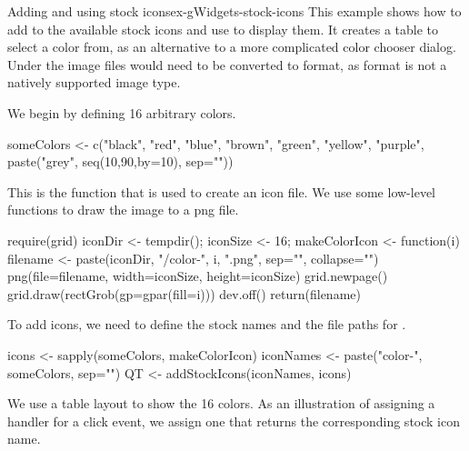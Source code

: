 \begin{example}{Adding and using stock icons}{ex-gWidgets-stock-icons}
This example shows how to add to the available stock icons and use
 to display them. It creates a table to select a color
from, as an alternative to a more complicated color chooser
dialog. Under  the image files would need to be
converted to  format, as  format is not a natively
supported image type.

We begin by defining 16 arbitrary colors.

\begin{Schunk}
\begin{Sinput}
 someColors <- c("black", "red", "blue", "brown",
                 "green", "yellow", "purple",
                 paste("grey", seq(10,90,by=10), sep=""))
\end{Sinput}
\end{Schunk}

This is the function that is used to create an icon file. We use some
low-level  functions to draw the image to a png file.
\begin{Schunk}
\begin{Sinput}
 require(grid)
 iconDir <- tempdir(); iconSize <- 16;
 makeColorIcon <- function(i) {
   filename <- paste(iconDir, "/color-", i, ".png",
                     sep="", collapse="")
   png(file=filename, width=iconSize, height=iconSize)
   grid.newpage()
   grid.draw(rectGrob(gp=gpar(fill=i)))
   dev.off()
   return(filename)
 }
\end{Sinput}
\end{Schunk}

To add icons, we need to define the stock names and the file paths for
.

\begin{Schunk}
\begin{Sinput}
 icons <- sapply(someColors, makeColorIcon)
 iconNames <- paste("color-", someColors, sep="")
 QT <- addStockIcons(iconNames, icons)
\end{Sinput}
\end{Schunk}

We use a table layout to show the 16 colors. As an illustration of
assigning a handler for a click event, we assign one that returns the
corresponding stock icon name.

\begin{Schunk}
\end{Schunk}
\end{example}

